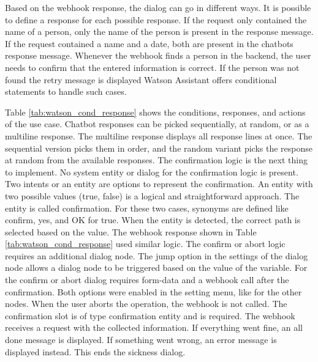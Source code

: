 Based on the webhook response, the dialog can go in different ways.
It is possible to define a response for each possible response.
If the request only contained the name of a person, only the name of the person is present in the response message.
If the request contained a name and a date, both are present in the chatbots response message.
Whenever the webhook finds a person in the backend, the user needs to confirm that the entered information is correct.
If the person was not found the retry message is displayed
Watson Assistant offers conditional statements to handle such cases.

Table \ref{tab:watson_cond_response} shows the conditions, responses, and actions of the use case.
Chatbot responses can be picked sequentially, at random, or as a multiline response.
The multiline response displays all response lines at once.
The sequential version picks them in order, and the random variant picks the response at random from the available responses.
The confirmation logic is the next thing to implement.
No system entity or dialog for the confirmation logic is present.
Two intents or an entity are options to represent the confirmation.
An entity with two possible values (true, false) is a logical and straightforward approach.
The entity is called confirmation.
For these two cases, synonyms are defined like confirm, yes, and OK for true.
When the entity is detected, the correct path is selected based on the value.
The webhook response shown in Table \ref{tab:watson_cond_response} used similar logic.
The confirm or abort logic requires an additional dialog node.
The jump option in the settings of the dialog node allows a dialog node to be triggered based on the value of the variable.
For the confirm or abort dialog requires form-data and a webhook call after the confirmation.
Both options were enabled in the setting menu, like for the other nodes.
When the user aborts the operation, the webhook is not called.
The confirmation slot is of type confirmation entity and is required.
The webhook receives a request with the collected information.
If everything went fine, an all done message is displayed.
If something went wrong, an error message is displayed instead.
This ends the sickness dialog.

